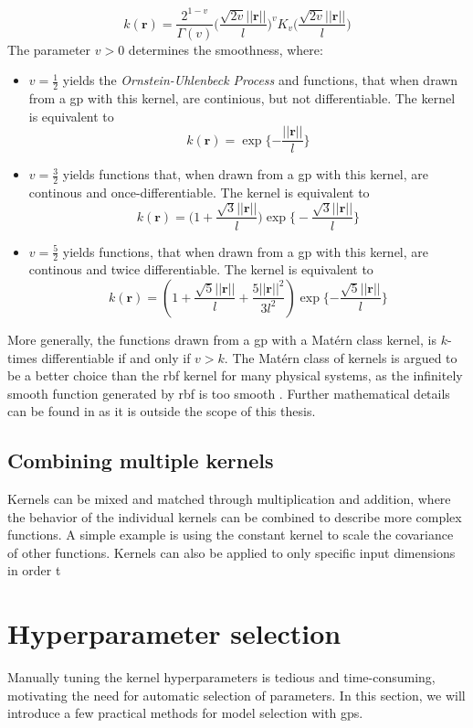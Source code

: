 \begin{equation}\label{eq:kernel_matern}
    k(\boldsymbol{r}) = \frac{2^{1-v}}{\Gamma(v)}\bigg(\frac{\sqrt{2 v} ||\boldsymbol{r}||}{l} \bigg)^v K_v \bigg(\frac{\sqrt{2v} || \boldsymbol{r}||}{l} \bigg)
\end{equation}
The parameter $v > 0$ determines the smoothness, where:
\begin{itemize}
    \item $v=\frac{1}{2}$ yields the \textit{Ornstein-Uhlenbeck Process} and functions, that when drawn from a \acrshort{gp} with this kernel, are continious, but not differentiable. The kernel is equivalent to $$k(\boldsymbol{r}) = \exp \{-\frac{||\boldsymbol{r}||}{l}\}$$
    \item $v=\frac{3}{2}$ yields functions that, when drawn from a \acrshort{gp} with this kernel, are continous and once-differentiable. The kernel is equivalent to $$k(\boldsymbol{r}) = \big(1 + \frac{\sqrt{3} ||\boldsymbol{r}||}{l}\big) \exp\big\{- \frac{\sqrt{3} ||\boldsymbol{r}||}{l}\big\}$$
    \item $v=\frac{5}{2}$ yields functions, that when drawn from a \acrshort{gp} with this kernel,  are continous and twice differentiable. The kernel is equivalent to $$k(\boldsymbol{r}) = (1 + \frac{\sqrt{5} ||\boldsymbol{r}||}{l} + \frac{5 ||\boldsymbol{r}||^2}{3 l^2}) \exp\{- \frac{\sqrt{5} ||\boldsymbol{r}||}{l}\}$$
\end{itemize}
More generally, the functions drawn from a \acrshort{gp} with a Matérn class kernel, is $k$-times differentiable if and only if $v > k$\cite{rasmussen}. The Matérn class of kernels is argued to be a better choice than the \acrshort{rbf} kernel for many physical systems, as the infinitely smooth function generated by \acrshort{rbf} is too smooth \cite{rasmussen}.
Further mathematical details can be found in \cite[sec.~4.2]{rasmussen} as it is outside the scope of this thesis.


\subsection{Combining multiple kernels}
Kernels can be mixed and matched through multiplication and addition, where the behavior of the individual kernels can be combined to describe more complex functions. A simple example is using the constant kernel to scale the covariance of other functions. Kernels can also be applied to only specific input dimensions in order t
\section{Hyperparameter selection}
Manually tuning the kernel hyperparameters is tedious and time-consuming, motivating the need for automatic selection of parameters. In this section, we will introduce a few practical methods for model selection with \acrshort{gp}s.


